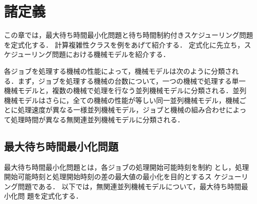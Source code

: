 \documentclass[12pt]{optlab-bachelor}
\begin{document}
\chapter{諸定義}\label{c_2}
この章では，最大待ち時間最小化問題と待ち時間制約付きスケジューリング問題を定式化する．
計算複雑性クラスを例をあげて紹介する．
定式化に先立ち，スケジューリング問題における機械モデルを紹介する．

各ジョブを処理する機械の性能によって，機械モデルは次のように分類され
る．まず，ジョブを処理する機械の台数について，一つの機械で処理する単一
機械モデルと，複数の機械で処理を行なう並列機械モデルに分類される．並列
機械モデルはさらに，全ての機械の性能が等しい同一並列機械モデル，機械ご
とに処理速度が異なる一様並列機械モデル，ジョブと機械の組み合わせによっ
て処理時間が異なる無関連並列機械モデルに分類される．

\section{最大待ち時間最小化問題}
最大待ち時間最小化問題とは，各ジョブの処理開始可能時刻を制約
とし，処理開始可能時刻と処理開始時刻の差の最大値の最小化を目的とするス
ケジューリング問題である．
以下では，無関連並列機械モデルについて，最大待ち時間最小化問
題を定式化する．
\end{document}
